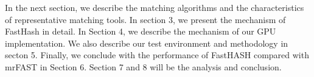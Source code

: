 In the next section, we describe the matching algorithms and the
characteristics of representative matching tools. In section 3, we present the
mechanism of FastHash in detail. In Section 4, we describe the mechanism of our
GPU implementation. We also describe our test environment and methodology in
secton 5. Finally, we conclude with the performance of FastHASH compared with
mrFAST in Section 6. Section 7 and 8 will be the analysis and conclusion.  \\

